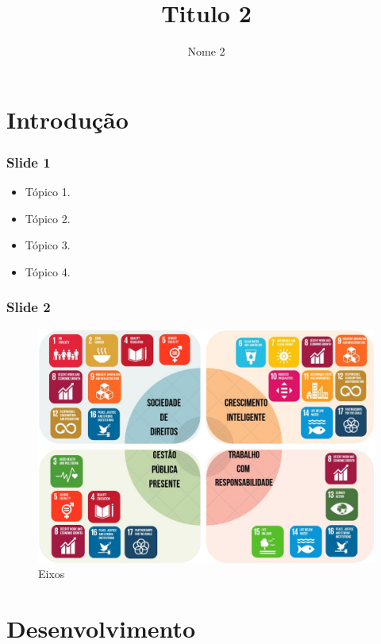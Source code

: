 \documentclass{beamer}
\title[Titulo 1]{Titulo 2}
\subtitle{}
\institute[SIGLA UNIDADE]{NOME UNIDADE}
\author[Nome 1]{Nome 2}
\begin{document}
  
\begin{frame}
    \setTitlestyleDissertation
    \maketitle
\end{frame}
\section{Introdução}

\begin{frame}
    \frametitle{Slide 1}
    
    \justifying
    \begin{itemize}[<+->]
        \item Tópico 1.
        \item Tópico 2.
        \item Tópico 3.
        \item {} Tópico 4.
    \end{itemize}
\end{frame} 

\begin{frame}
    \frametitle{Slide 2} 
    
    \begin{figure}
        \centering
        \includegraphics[width=.8\textwidth]{images/Figura.png}
        \caption{Eixos}
        \label{fig:ods}
    \end{figure}
\end{frame}

\section{Desenvolvimento}
\end{document}
